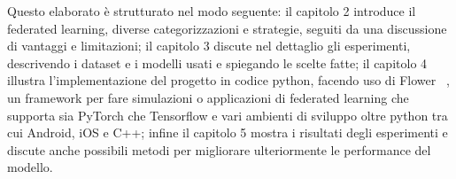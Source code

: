 Questo elaborato è strutturato nel modo seguente: il capitolo 2 
introduce il federated learning, diverse categorizzazioni e strategie, 
seguiti da una discussione di vantaggi e limitazioni; il capitolo 3 
discute nel dettaglio gli esperimenti, descrivendo i dataset e i 
modelli usati e spiegando le scelte fatte; il capitolo 4 illustra 
l'implementazione del progetto in codice python, facendo uso di Flower
~\cite{flowerai}, un framework per fare simulazioni o applicazioni
di federated learning che supporta 
sia PyTorch che Tensorflow e vari ambienti di 
sviluppo oltre python tra cui Android, iOS e C++; infine il capitolo 5
mostra i risultati degli esperimenti e discute anche possibili metodi 
per migliorare ulteriormente le performance del modello.
